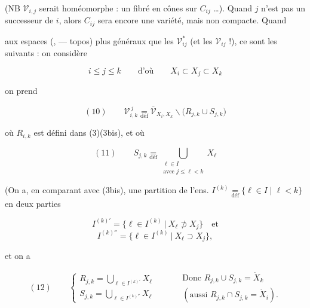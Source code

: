 \documentclass[11pt,a4paper]{article}
\begin{document}
(NB $\mathcal{V}_{i,j}$ serait homéomorphe : un fibré en cônes sur $C_{ij}$
…). Quand $j$ n'est pas un successeur de $i$, alors $C_{ij}$ sera encore
une variété, mais non compacte. Quand

aux espaces (,  — topos)  plus
généraux que les $\mathcal{V}^{*}_{ij}$ (et les $\mathcal{V}_{ij}$ !), ce sont
les suivants : on considère

\[
  i \leq j \leq k \qquad \text{d'où} \qquad X_i \subset X_j \subset X_k
\]

on prend

\[
  (10) \qquad
  \mathcal{V}^{\,j}_{i,k} \underset{\text{déf}}{=}
  \overline{\mathcal{V}}_{X_i, X_k} \smallsetminus
  \bigl( R_{j,k} \cup S_{j,k} \bigr)
\]

où $R_{i,k}$ est défini dans (3)(3bis), et où

\[
  (11) \qquad
  S_{j,k} \underset{\text{déf}}{=}
  \bigcup_{\substack{\ell \in I \\ \text{avec } j \leq \ell < k}} X_\ell
\]


(On a, en comparant avec (3bis), une partition de l'ens.
$I^{(k)} \underset{\text{déf}}{=} \{ \ell \in I \mid \ell < k \}$ en deux
parties

\[
  I^{(k)'} = \bigl\{ \ell \in I^{(k)} \ \big|\ X_\ell \not\supset X_j \bigr\}
  \quad \text{et}
\]
\[
  I^{(k)''} = \bigl\{ \ell \in I^{(k)} \ \big|\ X_\ell \supset X_j \bigr\},
\]

et on a

\[
  (12) \qquad
  \begin{cases}
    R_{j,k} = \bigcup_{\ell \in I^{(k)'}} X_\ell \\[2pt]
    S_{j,k} = \bigcup_{\ell \in I^{(k)''}} X_\ell
  \end{cases}
  \qquad
  \begin{aligned}
    &\text{Donc } R_{j,k} \cup S_{j,k} = \dot{X}_k \\
    &(\text{aussi } R_{j,k} \cap S_{j,k} = \dot{X}_i) .
  \end{aligned}
\]
\end{document}
